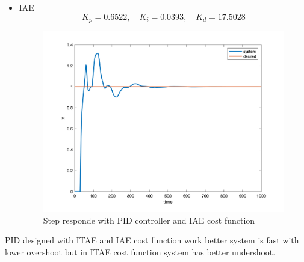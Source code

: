 \begin{itemize}
\begin{figure}[H]
   \end{figure}
   \item IAE
   $$
   K_p = 0.6522, \quad K_i = 0.0393, \quad K_d = 17.5028
   $$
   \begin{figure}[H]
      \caption{Step responde with PID controller and IAE cost function}
      \centering
      \includegraphics[width=11cm]{../Figure/Q2/IAE.png}
  \end{figure}
 \end{itemize}
 PID designed with ITAE and IAE cost function work better system is fast with lower overshoot but in ITAE cost function system has better undershoot.
